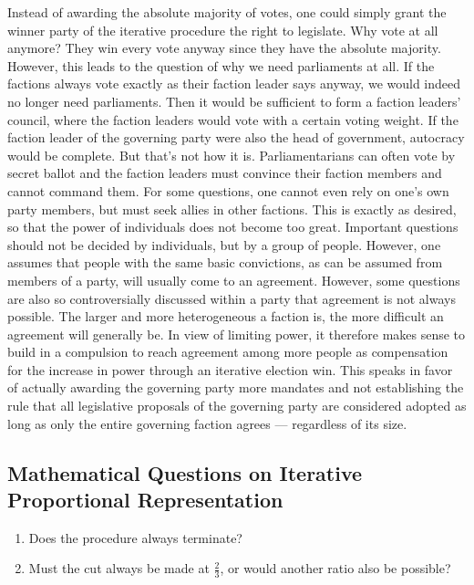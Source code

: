 Instead of awarding the absolute majority of votes, one could simply grant the
winner party of the iterative procedure the right to legislate. Why vote at all
anymore? They win every vote anyway since they have the absolute majority.
However, this leads to the question of why we need parliaments at all. If the factions always
vote exactly as their faction leader says anyway, we would indeed no longer need
parliaments. Then it would be sufficient to form a faction leaders' council, where the
faction leaders would vote with a certain voting weight. If the
faction leader of the governing party were also the head of government,
autocracy would be complete.
But that's not how it is. Parliamentarians can often vote by secret ballot and the
faction leaders must convince their faction members and cannot
command them. For some questions, one cannot even rely on one's own party members,
but must seek allies in other factions. This is exactly as desired,
so that the power of individuals does not become too great. Important questions should not be
decided by individuals, but by a group of people. However, one assumes that people
with the same basic convictions, as can be assumed from members of a party,
will usually come to an agreement. However, some questions are also so
controversially discussed within a party that agreement is not always possible. The larger and more heterogeneous a
faction is, the more difficult an agreement will generally be. In view of
limiting power, it therefore makes sense to build in a compulsion to reach agreement among more people
as compensation for the increase in power through an iterative election win. This speaks in favor of
actually awarding the governing party more mandates and not establishing the rule that
all legislative proposals of the governing party are considered adopted as long as only the entire
governing faction agrees --- regardless of its size.

\subsection{Mathematical Questions on Iterative Proportional Representation}

\begin{enumerate}
  \item Does the procedure always terminate?
  \item Must the cut always be made at $\tfrac{2}{3}$, or would another
    ratio also be possible?
\end{enumerate}


